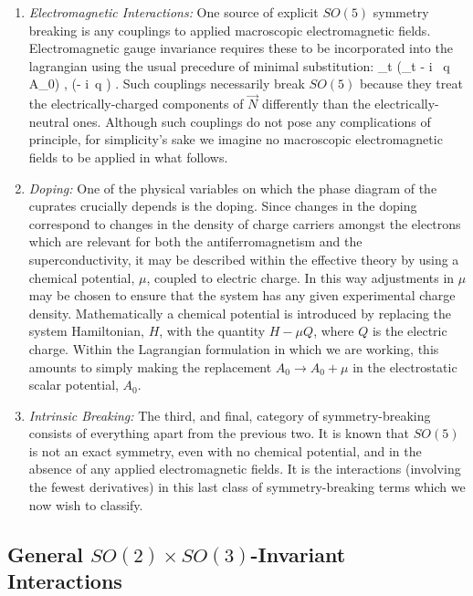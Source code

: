 \documentclass[12pt]{report}
\begin{document}
\begin{enumerate}

\item
{\it Electromagnetic Interactions:} One source of explicit
$SO(5)$ symmetry breaking is any couplings to applied
macroscopic electromagnetic fields. Electromagnetic gauge
invariance requires these to be incorporated into the
lagrangian using the usual precedure of minimal
substitution:
%
\eq
\label{minsubst}
\partial_t \psi \to (\partial_t - i \, q \; A_0) \psi,
\qquad \nabla \psi \to (\nabla - i\, q \; \Bfa) \psi.
\eeq
%
Such couplings necessarily break $SO(5)$ because they treat
the electrically-charged components of $\vec N$ differently
than the electrically-neutral ones. Although such couplings
do not pose any complications of principle, for simplicity's
sake we imagine no macroscopic electromagnetic fields to be
applied in what follows.

\item
{\it Doping:}
One of the physical variables on which the phase diagram of
the cuprates crucially depends is the doping. Since changes 
in the doping correspond to changes in the density of charge
carriers amongst the electrons which are relevant 
for both the antiferromagnetism and the superconductivity,
it may be described within the effective theory by using a 
chemical potential, $\mu$, coupled to electric charge. 
In this way adjustments in $\mu$ may be chosen to
ensure that the system has any given experimental charge
density. Mathematically a chemical potential is introduced 
by replacing the system Hamiltonian, $H$, with the 
quantity $H - \mu Q$, where $Q$ is the electric
charge. Within the Lagrangian formulation in which
we are working, this amounts to simply making 
the replacement $A_0 \to A_0 + \mu$ in the electrostatic
scalar potential, $A_0$.

\item
{\it Intrinsic Breaking:} The third, and final, category of
symmetry-breaking consists of everything apart from the
previous two. It is known that $SO(5)$ is not an exact
symmetry, even with no chemical potential, and in the
absence of any applied electromagnetic fields. It is the
interactions (involving the fewest derivatives) in this
last class of symmetry-breaking terms which we now wish to
classify.

\end{enumerate}

\subsection{General $SO(2) \times SO(3)$-Invariant
Interactions}
\end{document}
